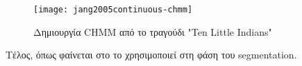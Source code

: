 \begin{figure}
	\centering
	\texttt{[image: jang2005continuous-chmm]}
	\caption{Δημιουργία CHMM από το τραγούδι "Ten Little Indians" \protect\cite{jang2005continuous}}
	\label{fig:jang2005continuous-chmm}
\end{figure}

Τέλος, όπως φαίνεται στο  το \cite{slaney2008locality} χρησιμοποιεί \hmm{} στη φάση του segmentation.

\undef{\hmm}
